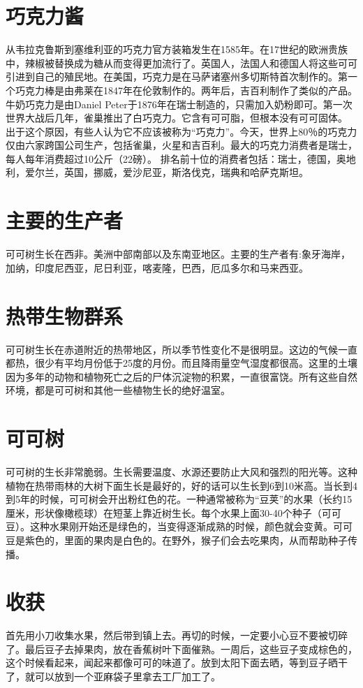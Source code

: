 \section{巧克力酱}
     从韦拉克鲁斯到塞维利亚的巧克力官方装箱发生在1585年。在17世纪的欧洲贵族中，辣椒被替换成为糖从而变得更加流行了。英国人，法国人和德国人将这些可可引进到自己的殖民地。在美国，巧克力是在马萨诸塞州多切斯特首次制作的。第一个巧克力棒是由弗莱在1847年在伦敦制作的。两年后，吉百利制作了类似的产品。 牛奶巧克力是由Daniel Peter于1876年在瑞士制造的，只需加入奶粉即可。第一次世界大战后几年，雀巢推出了白巧克力。它含有可可脂，但根本没有可可固体。 出于这个原因，有些人认为它不应该被称为“巧克力”。今天，世界上80％的巧克力仅由六家跨国公司生产，包括雀巢，火星和吉百利。最大的巧克力消费者是瑞士，每人每年消费超过10公斤（22磅）。 排名前十位的消费者包括：瑞士，德国，奥地利，爱尔兰，英国，挪威，爱沙尼亚，斯洛伐克，瑞典和哈萨克斯坦。


\section{主要的生产者}
     可可树生长在西非。美洲中部南部以及东南亚地区。主要的生产者有:象牙海岸，加纳，印度尼西亚，尼日利亚，喀麦隆，巴西，厄瓜多尔和马来西亚。

\section{热带生物群系}
     可可树生长在赤道附近的热带地区，所以季节性变化不是很明显。这边的气候一直都热，很少有平均月份低于25度的月份。而且降雨量空气湿度都很高。这里的土壤因为多年的动物和植物死亡之后的尸体沉淀物的积累，一直很富饶。所有这些自然环境，都是可可树和其他一些植物生长的绝好温室。

\section{可可树}
     可可树的生长非常脆弱。生长需要温度、水源还要防止大风和强烈的阳光等。这种植物在热带雨林的大树下面生长是最好的，好的话可以生长到6到10米高。当长到4到5年的时候，可可树会开出粉红色的花。一种通常被称为“豆荚”的水果（长约15厘米，形状像橄榄球）在短茎上靠近树生长。每个水果上面30-40个种子（可可豆）。这种水果刚开始还是绿色的，当变得逐渐成熟的时候，颜色就会变黄。可可豆是紫色的，里面的果肉是白色的。在野外，猴子们会去吃果肉，从而帮助种子传播。

\section{收获}
      首先用小刀收集水果，然后带到镇上去。再切的时候，一定要小心豆不要被切碎了。最后豆子去掉果肉，放在香蕉树叶下面催熟。一周后，这些豆子变成棕色的，这个时候看起来，闻起来都像可可的味道了。放到太阳下面去晒，等到豆子晒干了，就可以放到一个亚麻袋子里拿去工厂加工了。

